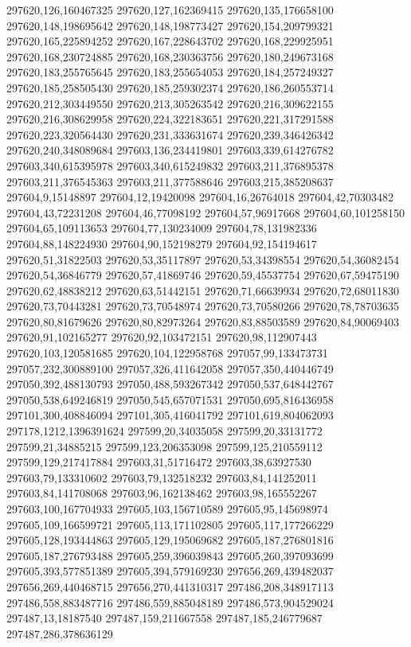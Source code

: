 297620,126,160467325
297620,127,162369415
297620,135,176658100
297620,148,198695642
297620,148,198773427
297620,154,209799321
297620,165,225894252
297620,167,228643702
297620,168,229925951
297620,168,230724885
297620,168,230363756
297620,180,249673168
297620,183,255765645
297620,183,255654053
297620,184,257249327
297620,185,258505430
297620,185,259302374
297620,186,260553714
297620,212,303449550
297620,213,305263542
297620,216,309622155
297620,216,308629958
297620,224,322183651
297620,221,317291588
297620,223,320564430
297620,231,333631674
297620,239,346426342
297620,240,348089684
297603,136,234419801
297603,339,614276782
297603,340,615395978
297603,340,615249832
297603,211,376895378
297603,211,376545363
297603,211,377588646
297603,215,385208637
297604,9,15148897
297604,12,19420098
297604,16,26764018
297604,42,70303482
297604,43,72231208
297604,46,77098192
297604,57,96917668
297604,60,101258150
297604,65,109113653
297604,77,130234009
297604,78,131982336
297604,88,148224930
297604,90,152198279
297604,92,154194617
297620,51,31822503
297620,53,35117897
297620,53,34398554
297620,54,36082454
297620,54,36846779
297620,57,41869746
297620,59,45537754
297620,67,59475190
297620,62,48838212
297620,63,51442151
297620,71,66639934
297620,72,68011830
297620,73,70443281
297620,73,70548974
297620,73,70580266
297620,78,78703635
297620,80,81679626
297620,80,82973264
297620,83,88503589
297620,84,90069403
297620,91,102165277
297620,92,103472151
297620,98,112907443
297620,103,120581685
297620,104,122958768
297057,99,133473731
297057,232,300889100
297057,326,411642058
297057,350,440446749
297050,392,488130793
297050,488,593267342
297050,537,648442767
297050,538,649246819
297050,545,657071531
297050,695,816436958
297101,300,408846094
297101,305,416041792
297101,619,804062093
297178,1212,1396391624
297599,20,34035058
297599,20,33131772
297599,21,34885215
297599,123,206353098
297599,125,210559112
297599,129,217417884
297603,31,51716472
297603,38,63927530
297603,79,133310602
297603,79,132518232
297603,84,141252011
297603,84,141708068
297603,96,162138462
297603,98,165552267
297603,100,167704933
297605,103,156710589
297605,95,145698974
297605,109,166599721
297605,113,171102805
297605,117,177266229
297605,128,193444863
297605,129,195069682
297605,187,276801816
297605,187,276793488
297605,259,396039843
297605,260,397093699
297605,393,577851389
297605,394,579169230
297656,269,439482037
297656,269,440468715
297656,270,441310317
297486,208,348917113
297486,558,883487716
297486,559,885048189
297486,573,904529024
297487,13,18187540
297487,159,211667558
297487,185,246779687
297487,286,378636129
